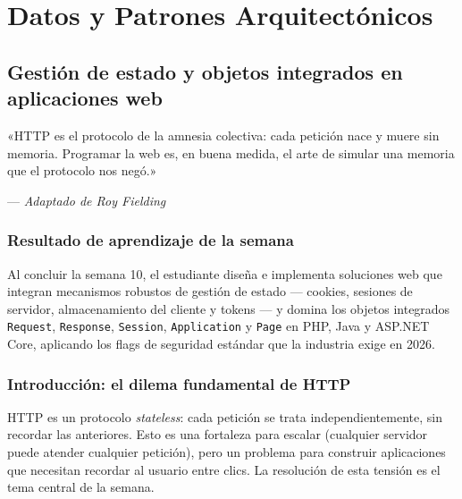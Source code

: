 \part{Datos y Patrones Arquitectónicos}

\chapter{Gestión de estado y objetos integrados en aplicaciones web}
\label{cap:semana10}

\epigraph{«HTTP es el protocolo de la amnesia colectiva: cada petición
nace y muere sin memoria. Programar la web es, en buena medida, el arte
de simular una memoria que el protocolo nos negó.»}{--- \textit{Adaptado
de Roy Fielding}}

\section*{Resultado de aprendizaje de la semana}
Al concluir la semana 10, el estudiante diseña e implementa soluciones
web que integran mecanismos robustos de gestión de estado --- cookies,
sesiones de servidor, almacenamiento del cliente y tokens --- y domina
los objetos integrados \texttt{Request}, \texttt{Response},
\texttt{Session}, \texttt{Application} y \texttt{Page} en PHP, Java y
ASP.NET Core, aplicando los flags de seguridad estándar que la
industria exige en 2026.

\section{Introducción: el dilema fundamental de HTTP}

HTTP es un protocolo \emph{stateless}: cada petición se
trata independientemente, sin recordar las anteriores. Esto es una
fortaleza para escalar (cualquier servidor puede atender cualquier
petición), pero un problema para construir aplicaciones que necesitan
recordar al usuario entre clics. La resolución de esta tensión es el
tema central de la semana.


